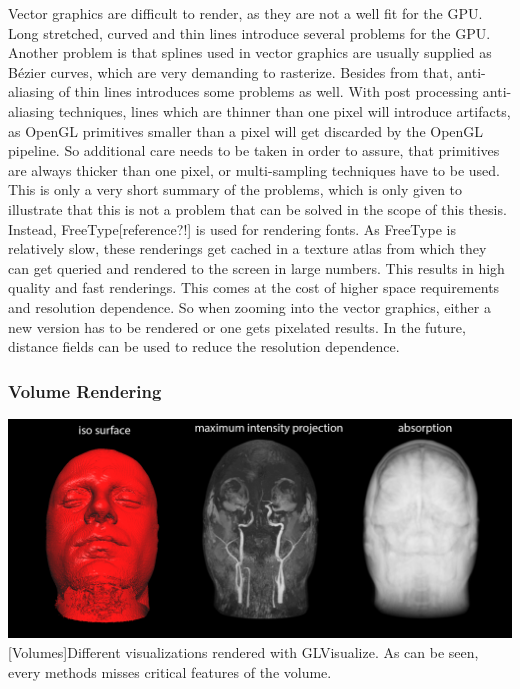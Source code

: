 Vector graphics are difficult to render, as they are not a well fit for the \ac{GPU}.
Long stretched, curved and thin lines introduce several problems for the GPU\cite{Liland565821}.
Another problem is that splines used in vector graphics are usually supplied as Bézier curves, which are very demanding to rasterize.
Besides from that, anti-aliasing of thin lines introduces some problems as well. With post processing anti-aliasing techniques, lines which are thinner than one pixel will introduce artifacts, as OpenGL primitives smaller than a pixel will get discarded by the OpenGL pipeline. So additional care needs to be taken in order to assure, that primitives are always thicker than one pixel, or multi-sampling techniques have to be used.
This is only a very short summary of the problems, which is only given to illustrate that this is not a problem that can be solved in the scope of this thesis. 
Instead, FreeType[reference?!] is used for rendering fonts. As FreeType is relatively slow, these renderings get cached in a texture atlas from which they can get queried and rendered to the screen in large numbers.
This results in high quality and fast renderings. This comes at the cost of higher space requirements and resolution dependence.
So when zooming into the vector graphics, either a new version has to be rendered or one gets pixelated results.
In the future, distance fields can be used to reduce the resolution dependence\cite{Green:2007:IAM:1281500.1281665}.

\subsubsection{Volume Rendering}
\vspace{1em}
\begin{minipage}{\linewidth}
    \centering
    \includegraphics[width=0.9\linewidth]{graphics/volumes.png}
    [Volumes]{Different visualizations rendered with GLVisualize. As can be seen, every methods misses critical features of the volume.}
    \label{fig:volumes}
\end{minipage}

